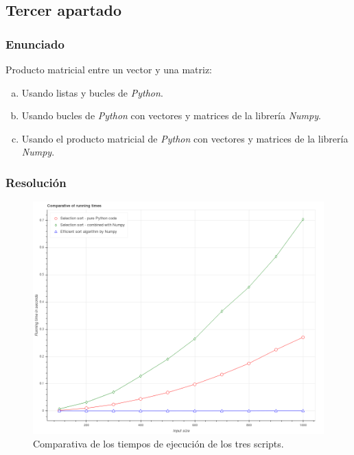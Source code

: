 \documentclass[12pt,twoside]{article}
\begin{document}
\subsection{Tercer apartado}

\subsubsection{Enunciado}

\noindent
Producto matricial entre un vector y una matriz:

\begin{enumerate}[(a)]

\item Usando listas y bucles de \textit{Python}.

\item Usando bucles de \textit{Python} con vectores y matrices de la librería \textit{Numpy}.

\item Usando el producto matricial de \textit{Python} con vectores y matrices de la librería \textit{Numpy}.

\end{enumerate}

\subsubsection{Resolución}

\begin{figure}[hbt]
\begin{center}
	\includegraphics[width=1\textwidth]{31.png}
	\caption{Comparativa de los tiempos de ejecución de los tres scripts.}
	\label{fig:fig4}
\end{center}
\end{figure}
\end{document}
